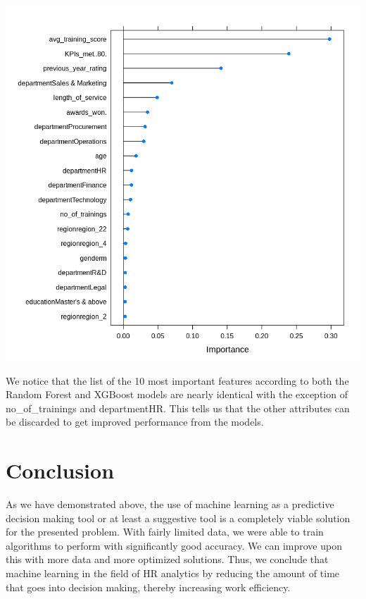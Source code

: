\documentclass[
]{article}
\let\origfigure\figure
\let\endorigfigure\endfigure
\renewenvironment{figure}[1][2] {
    \expandafter\origfigure\expandafter[H]
} {
    \endorigfigure
}
\begin{document}
\begin{figure}
\centering
\includegraphics{./imgs/xb_feat_imp.png}
\caption{Top 20 important features obtained for XGBoost without scaling
scores}
\end{figure}

We notice that the list of the 10 most important features according to
both the Random Forest and XGBoost models are nearly identical with the
exception of no\_of\_trainings and departmentHR. This tells us that the
other attributes can be discarded to get improved performance from the
models.

\hypertarget{conclusion}{%
\section{Conclusion}\label{conclusion}}

As we have demonstrated above, the use of machine learning as a
predictive decision making tool or at least a suggestive tool is a
completely viable solution for the presented problem. With fairly
limited data, we were able to train algorithms to perform with
significantly good accuracy. We can improve upon this with more data and
more optimized solutions. Thus, we conclude that machine learning in the
field of HR analytics by reducing the amount of time that goes into
decision making, thereby increasing work efficiency.
\end{document}
